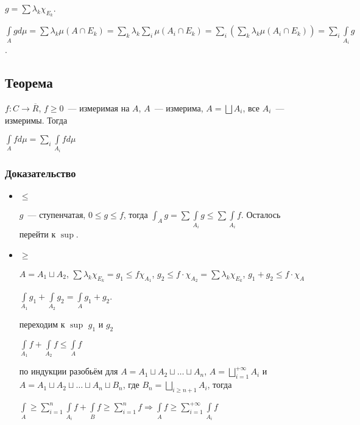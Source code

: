 \documentclass{article}
\begin{document}
            $g = \sum \lambda_k \chi_{E_k}$.
            
            $\int\limits_A g d \mu = \sum \lambda_k \mu (A \cap E_k) = \sum\limits_{k} \lambda_k \sum\limits_{i} \mu (A_i \cap E_k) = \sum\limits_i \left( \sum\limits_k \lambda_k \mu (A_i \cap E_k ) \right) = \sum\limits_i \int\limits_{A_i} g$.
            
    \subsection{Теорема}
    
        $f : C \rightarrow \overline{R}$, $f \geqslant 0$~--- измеримая на $A$, $A$~--- измерима, $A = \bigsqcup A_i$, все $A_i$~--- измеримы. Тогда
        
        $\int\limits_{A} f d \mu = \sum\limits_{i} \int\limits_{A_i} f d \mu$
            
        \subsubsection{Доказательство}
        
            \begin{itemize}
            
                \item $\leqslant$
                
                    $g$~--- ступенчатая, $0 \leqslant g \leqslant f$, тогда $\int_A g = \sum \int\limits_{A_i} g \leqslant \sum \int\limits_{A_i} f$. Осталось перейти к $\sup$.
                    
                \item $\geqslant$
                
                    $A = A_1 \sqcup A_2$, $\sum \lambda_k \chi_{E_k} = g_1 \leqslant f \chi_{A_1}$, $g_2 \leqslant f \cdot \chi_{A_2} = \sum \lambda_k \chi_{E_k}$, $g_1 + g_2 \leqslant f \cdot \chi_{A}$
                    
                    $\int\limits_{A_1} g_1 + \int\limits_{A_2} g_2 = \int\limits_{A} g_1 + g_2$.
                    
                    переходим к $\sup$ $g_1$ и $g_2$
                    
                    $\int\limits_{A_1} f + \int\limits_{A_2} f \leqslant \int\limits_{A} f$
                    
                    по индукции разобьём для $A = A_1 \sqcup A_2 \sqcup \ldots \sqcup A_n$, $A = \bigsqcup\limits^{+\infty}_{i = 1} A_i$ и $A = A_1 \sqcup A_2 \sqcup \ldots \sqcup A_n \sqcup B_n$, где $B_n = \bigsqcup\limits_{i \geqslant n + 1} A_i$, тогда
                    
                    $\int\limits_{A} \geqslant \sum\limits^n_{i = 1} \int\limits_{A_i} f + \int\limits_{B} f \geqslant \sum\limits^n_{i = 1} f \Rightarrow \int\limits_{A}f \geqslant \sum\limits^{+\infty}_{i = 1} \int\limits_{A_i} f$
                    
            \end{itemize}
            
\end{document}
